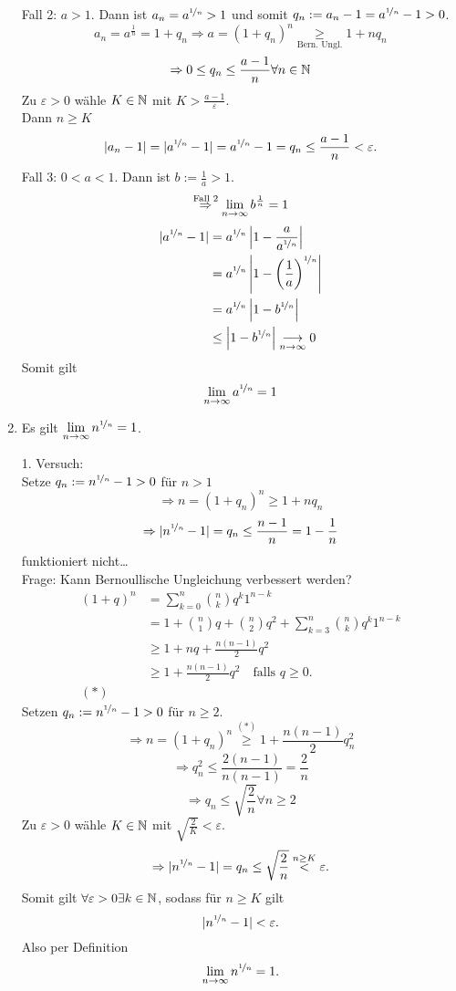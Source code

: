 \documentclass[../ana1.tex]{subfiles}
\begin{document}
\begin{bsp}
\begin{enumerate}
\begin{bew}
			Fall 2: \(a>1\). Dann ist \(a_n = a^{\nicefrac{1}{n}}>1\) und somit \(q_n := a_n-1 = a^{\nicefrac{1}{n}} -1 >0\).\\
			\[a_n = a^{\frac{1}{n}} = 1+q_n \Rightarrow a = {(1+q_n)}^n \underset{\text{Bern.\ Ungl.}}{\geq} 1+ nq_n\]
			\[\Rightarrow 0 \leq q_n \leq \frac{a-1}{n} \forall n\in\mathbb{N} \]
			Zu \(\varepsilon > 0\) wähle \(K\in\mathbb{N} \) mit \(K>\frac{a-1}{\varepsilon}\).\\
			Dann \(n\geq K\)
			\[|a_n-1| = |a^{\nicefrac{1}{n}}-1|= a^{\nicefrac{1}{n}} -1 = q_n \leq \frac{a-1}{n} < \varepsilon.\]
			Fall 3: \(0<a<1\). Dann ist \(b := \frac{1}{a}>1\).
			\[\overset{\text{Fall 2}}{\Rightarrow} \lim\limits_{n\rightarrow\infty} b^{\frac{1}{n}} = 1\]
			\begin{align*}
				|a^{\nicefrac{1}{n}}-1|&=a^{\nicefrac{1}{n}}\left|1-\frac{a}{a^{\nicefrac{1}{n}}}\right|\\
				&= a^{\nicefrac{1}{n}}\left| 1 - {\left(\frac{1}{a}\right)}^{\nicefrac{1}{n}} \right|\\
				&= a^{\nicefrac{1}{n}} \left|1-b^{\nicefrac{1}{n}}\right|\\
				&\leq \left|1-b^{\nicefrac{1}{n}} \right|\underset{n\rightarrow\infty}{\longrightarrow} 0
			\end{align*}
			Somit gilt
			\[\lim\limits_{n\rightarrow\infty} a^{\nicefrac{1}{n}} = 1\]
		\end{bew}
	\item Es gilt \(\lim\limits_{n\rightarrow\infty}n^{\nicefrac{1}{n}}=1\).
	\begin{bew}
		1. Versuch:\\
		Setze \(q_n := n^{\nicefrac{1}{n}} -1>0\) für \(n>1\) \\
		\[\Rightarrow n={(1+q_n)}^n \geq 1+nq_n\]
		\[\Rightarrow |n^{\nicefrac{1}{n}}-1| = q_n \leq \frac{n-1}{n} = 1-\frac{1}{n}\]
		funktioniert nicht\dots \\
		Frage: Kann Bernoullische Ungleichung verbessert werden?\\
		\begin{align*}
			{(1+q)}^n &= \sum_{k=0}^{n} \binom{n}{k} q^k1^{n-k}\\
			&=1+\binom{n}{1}q + \binom{n}{2}q^2 + \sum_{k=3}^{n}\binom{n}{k} q^k1^{n-k}\\
			&\geq 1+nq + \frac{n(n-1)}{2} q^2\\
			&\geq 1+\frac{n(n-1)}{2} q^2 \quad\text{falls }	q\geq 0.\\
			(*)
		\end{align*}
		Setzen \(q_n := n^{\nicefrac{1}{n}} -1 >0\) für \(n\geq 2\).
		\[\Rightarrow n = {(1+q_n)}^n \overset{(*)}{\geq}1+\frac{n(n-1)}{2} q_n^2\]
		\[\Rightarrow q_n^2 \leq \frac{2(n-1)}{n(n-1)} = \frac{2}{n}\]
		\[\Rightarrow q_n \leq \sqrt{\frac{2}{n}} \forall n\geq 2\]
		Zu \(\varepsilon >0\) wähle \(K\in\mathbb{N} \) mit \(\sqrt{\frac{2}{K}}<\varepsilon \).
		\[\Rightarrow |n^{\nicefrac{1}{n}} -1| = q_n \leq \sqrt{\frac{2}{n}} \overset{n\geq K}{<} \varepsilon.\]
		Somit gilt \(\forall\varepsilon>0\exists k\in\mathbb{N} \), sodass für \(n\geq K\) gilt
		\[|n^{\nicefrac{1}{n}} - 1| <\varepsilon.\]
		Also per Definition
		\[\lim\limits_{n\rightarrow\infty} n^{\nicefrac{1}{n}} = 1.\]
	\end{bew}
	\end{enumerate}
\end{bsp}
\end{document}
